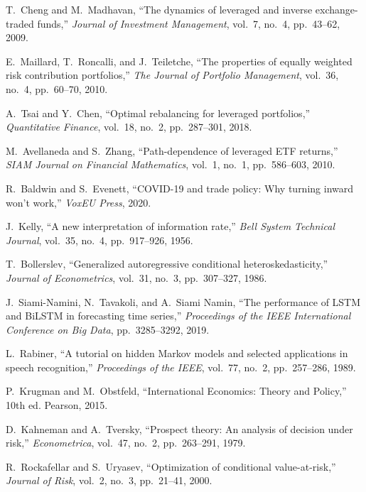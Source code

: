 \documentclass[onecolumn,11pt]{IEEEtran}
\begin{document}
\begin{thebibliography}{12}

T.~Cheng and M.~Madhavan,
``The dynamics of leveraged and inverse exchange-traded funds,''
\emph{Journal of Investment Management}, vol.~7, no.~4, pp.~43--62, 2009.

E.~Maillard, T.~Roncalli, and J.~Teiletche,
``The properties of equally weighted risk contribution portfolios,''
\emph{The Journal of Portfolio Management}, vol.~36, no.~4, pp.~60--70, 2010.

A.~Tsai and Y.~Chen,
``Optimal rebalancing for leveraged portfolios,''
\emph{Quantitative Finance}, vol.~18, no.~2, pp.~287--301, 2018.

M.~Avellaneda and S.~Zhang,
``Path-dependence of leveraged ETF returns,''
\emph{SIAM Journal on Financial Mathematics}, vol.~1, no.~1, pp.~586--603, 2010.

R.~Baldwin and S.~Evenett,
``COVID-19 and trade policy: Why turning inward won't work,''
\emph{VoxEU Press}, 2020.

J.~Kelly,
``A new interpretation of information rate,''
\emph{Bell System Technical Journal}, vol.~35, no.~4, pp.~917--926, 1956.

T.~Bollerslev,
``Generalized autoregressive conditional heteroskedasticity,''
\emph{Journal of Econometrics}, vol.~31, no.~3, pp.~307--327, 1986.

J.~Siami-Namini, N.~Tavakoli, and A.~Siami Namin,
``The performance of LSTM and BiLSTM in forecasting time series,''
\emph{Proceedings of the IEEE International Conference on Big Data}, pp.~3285--3292, 2019.

L.~Rabiner,
``A tutorial on hidden Markov models and selected applications in speech recognition,''
\emph{Proceedings of the IEEE}, vol.~77, no.~2, pp.~257--286, 1989.

P.~Krugman and M.~Obstfeld,
``International Economics: Theory and Policy,''
10th ed. Pearson, 2015.

D.~Kahneman and A.~Tversky,
``Prospect theory: An analysis of decision under risk,''
\emph{Econometrica}, vol.~47, no.~2, pp.~263--291, 1979.

R.~Rockafellar and S.~Uryasev,
``Optimization of conditional value-at-risk,''
\emph{Journal of Risk}, vol.~2, no.~3, pp.~21--41, 2000.

\end{thebibliography}
\end{document}
